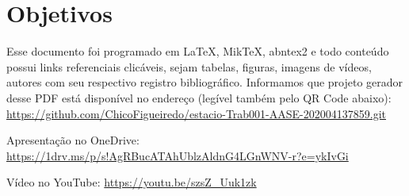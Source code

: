 \chapter{Objetivos}

Esse documento foi programado em \LaTeX, MikTeX, abntex2 e todo conteúdo possui links referenciais clicáveis, sejam tabelas, figuras, imagens de vídeos, autores com seu respectivo registro bibliográfico.
Informamos que projeto gerador desse PDF está disponível no endereço (legível também pelo QR Code abaixo): \\
\url{https://github.com/ChicoFigueiredo/estacio-Trab001-AASE-202004137859.git} \\
\begin{center}
    \href{https://github.com/ChicoFigueiredo/estacio-Trab001-AASE-202004137859.git}{
    }
\end{center}


Apresentação no OneDrive: \url{https://1drv.ms/p/s!AgRBucATAhUblzAldnG4LGnWNV-r?e=ykIvGi} \\
\begin{center}
    \href{https://1drv.ms/p/s!AgRBucATAhUblzAldnG4LGnWNV-r?e=ykIvGi}{
    }
\end{center}

Vídeo no YouTube: \url{https://youtu.be/szsZ_Uuk1zk} \\
\begin{center}
    \href{https://youtu.be/szsZ_Uuk1zk}{
    }
\end{center}
